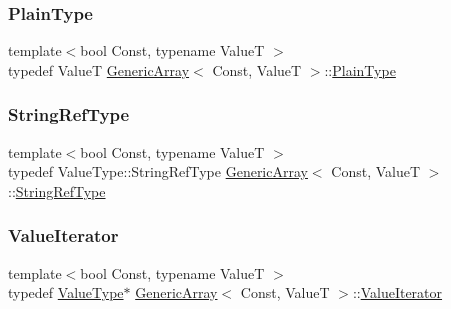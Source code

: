 \mbox{\label{classGenericArray_aecea8be3dca6799bc523f4bffd221839}} 
\subsubsection{\texorpdfstring{Plain\+Type}{PlainType}}
{\footnotesize\ttfamily template$<$bool Const, typename ValueT $>$ \\
typedef ValueT \hyperlink{classGenericArray}{Generic\+Array}$<$ Const, ValueT $>$\+::\hyperlink{classGenericArray_aecea8be3dca6799bc523f4bffd221839}{Plain\+Type}}

\mbox{\label{classGenericArray_a8dcb9e2a2e103ce1051c16a7486465b9}} 
\subsubsection{\texorpdfstring{String\+Ref\+Type}{StringRefType}}
{\footnotesize\ttfamily template$<$bool Const, typename ValueT $>$ \\
typedef Value\+Type\+::\+String\+Ref\+Type \hyperlink{classGenericArray}{Generic\+Array}$<$ Const, ValueT $>$\+::\hyperlink{classGenericArray_a8dcb9e2a2e103ce1051c16a7486465b9}{String\+Ref\+Type}}

\mbox{\label{classGenericArray_afc6ad62c3f00531fa378db266182704a}} 
\subsubsection{\texorpdfstring{Value\+Iterator}{ValueIterator}}
{\footnotesize\ttfamily template$<$bool Const, typename ValueT $>$ \\
typedef \hyperlink{classGenericArray_a93e53f38a99fc5167eb2a28653de64ed}{Value\+Type}$\ast$ \hyperlink{classGenericArray}{Generic\+Array}$<$ Const, ValueT $>$\+::\hyperlink{classGenericArray_afc6ad62c3f00531fa378db266182704a}{Value\+Iterator}}

\mbox{\label{classGenericArray_a93e53f38a99fc5167eb2a28653de64ed}} 
